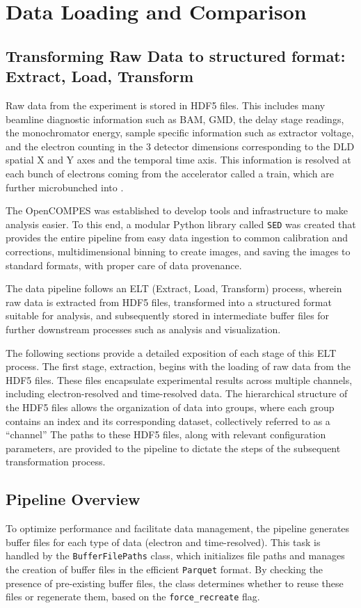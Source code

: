 \chapter{Data Loading and Comparison}
\section{Transforming Raw Data to structured format: Extract, Load, Transform}
Raw data from the experiment is stored in \gls{HDF5} files. This includes many \gls{beamline} diagnostic information such as \gls{BAM}, \gls{GMD}, the delay stage readings, the monochromator energy, sample specific information such as extractor voltage, and the electron counting in the 3 detector dimensions corresponding to the \gls{DLD} spatial X and Y axes and the temporal time axis. This information is resolved at each bunch of electrons coming from the accelerator called a \gls{train}, which are further microbunched into .

The \gls{OpenCOMPES} was established to develop tools and infrastructure to make analysis easier. To this end, a modular Python library called \texttt{\gls{SED}} was created that provides the entire pipeline from easy data ingestion to common calibration and corrections, multidimensional binning to create images, and saving the images to standard formats, with proper care of data provenance.

The data pipeline follows an ELT (Extract, Load, Transform) process, wherein raw data is extracted from \gls{HDF5} files, transformed into a structured format suitable for analysis, and subsequently stored in intermediate buffer files for further downstream processes such as analysis and visualization.

The following sections provide a detailed exposition of each stage of this ELT process. The first stage, extraction, begins with the loading of raw data from the \gls{HDF5} files. These files encapsulate experimental results across multiple channels, including electron-resolved and time-resolved data. The hierarchical structure of the \gls{HDF5} files allows the organization of data into groups, where each group contains an index and its corresponding dataset, collectively referred to as a “channel” The paths to these \gls{HDF5} files, along with relevant configuration parameters, are provided to the pipeline to dictate the steps of the subsequent transformation process.

\section*{Pipeline Overview}
To optimize performance and facilitate data management, the pipeline generates buffer files for each type of data (electron and time-resolved). This task is handled by the \texttt{BufferFilePaths} class, which initializes file paths and manages the creation of buffer files in the efficient \texttt{Parquet} format. By checking the presence of pre-existing buffer files, the class determines whether to reuse these files or regenerate them, based on the \texttt{force\_recreate} flag.

